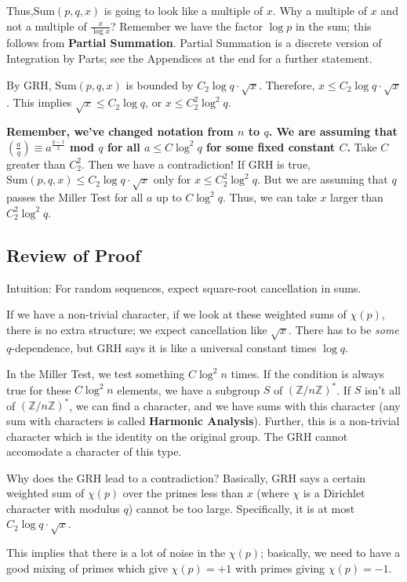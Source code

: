 \documentclass[12pt,letterpaper]{report}
\newcommand{\Z}{\ensuremath{\mathbb{Z}}}
\newcommand{\ZnZf}{ (\Z / n\Z)^{*}}
\newcommand\lag[2]{\ensuremath{\left(\frac{#1}{#2}\right)}}
\begin{document}
Thus,$\mbox{Sum}(p,q,x)$ is going to look like a multiple of $x$.
Why a multiple of $x$ and not a multiple of $\frac{x}{\log x}$?
Remember we have the factor $\log p$ in the sum; this follows from
\textbf{Partial Summation}. Partial Summation is a discrete
version of Integration by Parts; see the Appendices at the end for
a further statement.

By GRH, $\mbox{Sum}(p,q,x)$ is bounded by $C_2 \log q \cdot
\sqrt{x}$. Therefore, $x \le C_2 \log q \cdot \sqrt{x}$. This
implies $\sqrt{x} \le C_2 \log q$, or $x \le C_2^2 \log^2 q$.

\textbf{Remember, we've changed notation from $n$ to $q$. We are
assuming that $\lag{a}{q} \equiv a^{\frac{q-1}{2}}$ mod $q$ for
all $a \le C \log^2 q$ for some fixed constant $C$.} Take $C$
greater than $C_2^2$. Then we have a contradiction! If GRH is
true, $\mbox{Sum}(p,q,x) \le C_2 \log q \cdot \sqrt{x}$ only for
$x \le C_2^2 \log^2 q$. But we are assuming that $q$ passes the
Miller Test for all $a$ up to $C \log^2 q$. Thus, we can take $x$
larger than $C_2^2 \log^2 q$.


\subsection{Review of Proof}

Intuition: For random sequences, expect square-root cancellation
in sums.

If we have a non-trivial character, if we look at these weighted
sums of $\chi(p)$, there is no extra structure; we expect
cancellation like $\sqrt{x}$. There has to be \emph{some}
$q$-dependence, but GRH says it is like a universal constant times
$\log q$.

In the Miller Test, we test something $C \log^2 n$ times. If the
condition is always true for these $C \log^2 n$ elements, we have
a subgroup $S$ of $\ZnZf$. If $S$ isn't all of $\ZnZf$, we can
find a character, and we have sums with this character (any sum
with characters is called \textbf{Harmonic Analysis}). Further,
this is a non-trivial character which is the identity on the
original group. The GRH cannot accomodate a character of this
type.

Why does the GRH lead to a contradiction? Basically, GRH says a
certain weighted sum of $\chi(p)$ over the primes less than $x$
(where $\chi$ is a Dirichlet character with modulus $q$) cannot be
too large. Specifically, it is at most $C_2 \log q \cdot
\sqrt{x}$.

This implies that there is a lot of noise in the $\chi(p)$;
basically, we need to have a good mixing of primes which give
$\chi(p) = +1$ with primes giving $\chi(p) = -1$.
\end{document}
